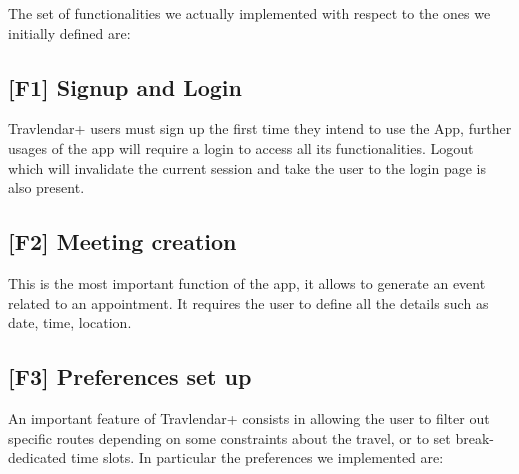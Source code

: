 The set of functionalities we actually implemented with respect to the ones we initially defined are:

\subsection{[F1] Signup and Login}
Travlendar+ users must sign up the first time they intend to use the App, further usages of the app will require a login to access all its functionalities. Logout which will invalidate the current session and take the user to the login page is also present.

\subsection{[F2] Meeting creation}
This is the most important function of the app, it allows to generate an event related to an appointment. It requires the user to define all the details such as date, time, location.

\subsection{[F3] Preferences set up}
An important feature of Travlendar+ consists in allowing the user to filter out specific routes depending on some constraints about the travel, or to set break-dedicated time slots. In particular the preferences we implemented are:

